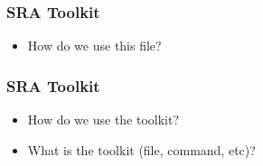 \documentclass[14pt]{beamer}
\begin{document}
\begin{frame}
\frametitle{SRA Toolkit}
\begin{itemize}
	\item<+-> How do we use this file?
\end{itemize}
\end{frame}

\begin{frame}
\frametitle{SRA Toolkit}
\begin{itemize}
	\item How do we use the toolkit?
	\item What is the toolkit (file, command, etc)?
	\ttfamily
	\footnotesize
\end{itemize}
\end{frame}

\end{document}
